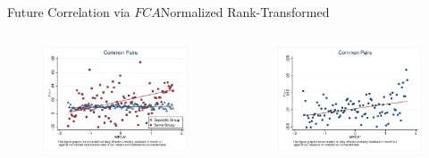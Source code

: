 \documentclass{beamer}
\begin{document}
	\begin{frame}{Future Correlation via $ FCA $}{Normalized Rank-Transformed}
		\label{Monthly16} 
		\begin{columns}
			\begin{figure}   
				\centering
				\includegraphics[width=\linewidth]{"Output/mcorr5bg.eps"}     \end{figure}            
			\begin{figure}
				\centering  
				\includegraphics[width=\linewidth]{"Output/mcorr5l.eps"}
			\end{figure}
		\end{columns}
		
		
	\end{frame}
	
\end{document}
